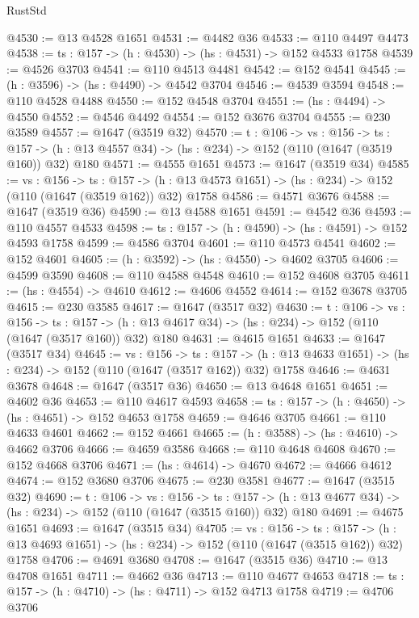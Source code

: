 \begin{lexlean}{RustStd}
\begin{coremodule}
@4530 := @13 @4528 @1651
@4531 := @4482 @36
@4533 := @110 @4497 @4473
@4538 := {ts : @157} -> (h : @4530) -> (hs : @4531) -> @152 @4533 @1758
@4539 := @4526 @3703
@4541 := @110 @4513 @4481
@4542 := @152 @4541
@4545 := (h : @3596) -> (hs : @4490) -> @4542 @3704
@4546 := @4539 @3594
@4548 := @110 @4528 @4488
@4550 := @152 @4548 @3704
@4551 := (hs : @4494) -> @4550
@4552 := @4546 @4492
@4554 := @152 @3676 @3704
@4555 := @230 @3589
@4557 := @1647 (@3519 @32)
@4570 := {t : @106} ->
  {vs : @156} ->
  {ts : @157} -> (h : @13 @4557 @34) -> (hs : @234) -> @152 (@110 (@1647 (@3519 @160)) @32) @180
@4571 := @4555 @1651
@4573 := @1647 (@3519 @34)
@4585 := {vs : @156} ->
  {ts : @157} -> (h : @13 @4573 @1651) -> (hs : @234) -> @152 (@110 (@1647 (@3519 @162)) @32) @1758
@4586 := @4571 @3676
@4588 := @1647 (@3519 @36)
@4590 := @13 @4588 @1651
@4591 := @4542 @36
@4593 := @110 @4557 @4533
@4598 := {ts : @157} -> (h : @4590) -> (hs : @4591) -> @152 @4593 @1758
@4599 := @4586 @3704
@4601 := @110 @4573 @4541
@4602 := @152 @4601
@4605 := (h : @3592) -> (hs : @4550) -> @4602 @3705
@4606 := @4599 @3590
@4608 := @110 @4588 @4548
@4610 := @152 @4608 @3705
@4611 := (hs : @4554) -> @4610
@4612 := @4606 @4552
@4614 := @152 @3678 @3705
@4615 := @230 @3585
@4617 := @1647 (@3517 @32)
@4630 := {t : @106} ->
  {vs : @156} ->
  {ts : @157} -> (h : @13 @4617 @34) -> (hs : @234) -> @152 (@110 (@1647 (@3517 @160)) @32) @180
@4631 := @4615 @1651
@4633 := @1647 (@3517 @34)
@4645 := {vs : @156} ->
  {ts : @157} -> (h : @13 @4633 @1651) -> (hs : @234) -> @152 (@110 (@1647 (@3517 @162)) @32) @1758
@4646 := @4631 @3678
@4648 := @1647 (@3517 @36)
@4650 := @13 @4648 @1651
@4651 := @4602 @36
@4653 := @110 @4617 @4593
@4658 := {ts : @157} -> (h : @4650) -> (hs : @4651) -> @152 @4653 @1758
@4659 := @4646 @3705
@4661 := @110 @4633 @4601
@4662 := @152 @4661
@4665 := (h : @3588) -> (hs : @4610) -> @4662 @3706
@4666 := @4659 @3586
@4668 := @110 @4648 @4608
@4670 := @152 @4668 @3706
@4671 := (hs : @4614) -> @4670
@4672 := @4666 @4612
@4674 := @152 @3680 @3706
@4675 := @230 @3581
@4677 := @1647 (@3515 @32)
@4690 := {t : @106} ->
  {vs : @156} ->
  {ts : @157} -> (h : @13 @4677 @34) -> (hs : @234) -> @152 (@110 (@1647 (@3515 @160)) @32) @180
@4691 := @4675 @1651
@4693 := @1647 (@3515 @34)
@4705 := {vs : @156} ->
  {ts : @157} -> (h : @13 @4693 @1651) -> (hs : @234) -> @152 (@110 (@1647 (@3515 @162)) @32) @1758
@4706 := @4691 @3680
@4708 := @1647 (@3515 @36)
@4710 := @13 @4708 @1651
@4711 := @4662 @36
@4713 := @110 @4677 @4653
@4718 := {ts : @157} -> (h : @4710) -> (hs : @4711) -> @152 @4713 @1758
@4719 := @4706 @3706

\end{coremodule}
\end{lexlean}
